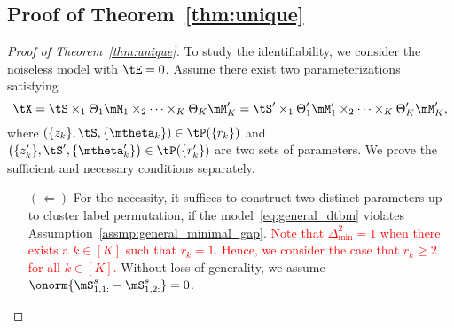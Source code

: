 \documentclass[lettersize,onecolumn,journal]{IEEEtran}
\theoremstyle{definition}
\theoremstyle{definition}
\newcommand{\of}[1]{\left(#1\right)}
\begin{document}
\subsection{Proof of Theorem~\ref{thm:unique}}

\begin{proof}[Proof of Theorem~\ref{thm:unique}] 

To study the identifiability, we consider the noiseless model with $\tE = 0$. Assume there exist two parameterizations satisfying
\begin{equation}\label{eq:another}
    \tX=\tS\times_1\Theta_1 \mM_1 \times_2 \cdots \times_K \Theta_K \mM'_K=\tS'\times_1\Theta'_1 \mM'_1 \times_2 \cdots \times_K \Theta'_K \mM'_K,
\end{equation}
where $\of{ \{z_k\}, \tS, \{ \mtheta_k \} } \in \tP(\{r_k\})$ and $\of{ \{z'_k\}, \tS', \{ \mtheta'_k \} } \in \tP(\{r_k'\})$ are two sets of parameters. We prove the sufficient and necessary conditions separately.

\begin{enumerate}[wide]
    \item[$(\Leftarrow)$] For the necessity, it suffices to construct two distinct parameters up to cluster label permutation, if the model~\eqref{eq:general_dtbm} violates Assumption~\ref{assmp:general_minimal_gap}. \textcolor{red}{Note that $\Delta_{\min}^2 = 1$ when there exists a $k \in [K]$ such that $r_k = 1$. Hence, we consider the case that  $r_k \geq 2$ for all $k \in [K]$.} Without loss of generality, we assume $\onorm{ \mS_{1,1:}^s - \mS_{1,2:}^s } = 0$.


\end{enumerate}
\end{proof}
\end{document}
